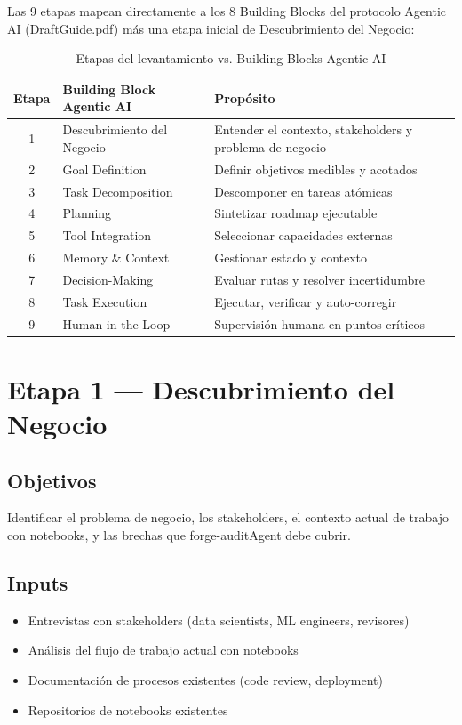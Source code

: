 \documentclass[12pt,a4paper]{article}
\begin{document}
Las 9 etapas mapean directamente a los 8 Building Blocks del protocolo Agentic AI (DraftGuide.pdf) más una etapa inicial de Descubrimiento del Negocio:

\begin{table}[h]
\centering
\begin{tabular}{cll}
\toprule
\textbf{Etapa} & \textbf{Building Block Agentic AI} & \textbf{Propósito} \\
\midrule
1  & Descubrimiento del Negocio     & Entender el contexto, stakeholders y problema de negocio \\
2  & Goal Definition                & Definir objetivos medibles y acotados \\
3  & Task Decomposition             & Descomponer en tareas atómicas \\
4  & Planning                       & Sintetizar roadmap ejecutable \\
5  & Tool Integration               & Seleccionar capacidades externas \\
6  & Memory \& Context              & Gestionar estado y contexto \\
7  & Decision-Making                & Evaluar rutas y resolver incertidumbre \\
8  & Task Execution                 & Ejecutar, verificar y auto-corregir \\
9  & Human-in-the-Loop              & Supervisión humana en puntos críticos \\
\bottomrule
\end{tabular}
\caption{Etapas del levantamiento vs. Building Blocks Agentic AI}
\end{table}

\section{Etapa 1 --- Descubrimiento del Negocio}

\subsection*{Objetivos}
Identificar el problema de negocio, los stakeholders, el contexto actual de trabajo con notebooks, y las brechas que forge-auditAgent debe cubrir.

\subsection*{Inputs}
\begin{itemize}
  \item Entrevistas con stakeholders (data scientists, ML engineers, revisores)
  \item Análisis del flujo de trabajo actual con notebooks
  \item Documentación de procesos existentes (code review, deployment)
  \item Repositorios de notebooks existentes
\end{itemize}
\end{document}
